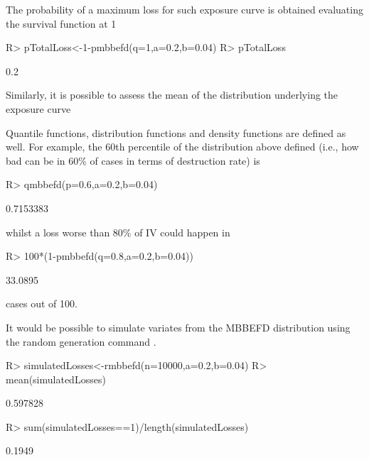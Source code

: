 \documentclass[nojss]{jss}
\begin{document}
The probability of a maximum loss for such exposure curve is obtained evaluating the survival function at 1

\begin{Schunk}
\begin{Sinput}
R> pTotalLoss<-1-pmbbefd(q=1,a=0.2,b=0.04)
R> pTotalLoss
\end{Sinput}
\begin{Soutput}
[1] 0.2
\end{Soutput}
\end{Schunk}

Similarly, it is possible to assess the mean of the distribution underlying the exposure curve 


Quantile functions, distribution functions and density functions are defined as well. For example, the 60th percentile of the distribution above defined (i.e., how bad can be in 60\% of cases in terms of destruction rate) is

\begin{Schunk}
\begin{Sinput}
R> qmbbefd(p=0.6,a=0.2,b=0.04)
\end{Sinput}
\begin{Soutput}
[1] 0.7153383
\end{Soutput}
\end{Schunk}

whilst a loss worse than 80\% of IV could happen in 

\begin{Schunk}
\begin{Sinput}
R> 100*(1-pmbbefd(q=0.8,a=0.2,b=0.04))
\end{Sinput}
\begin{Soutput}
[1] 33.0895
\end{Soutput}
\end{Schunk}

cases out of 100.

It would be possible to simulate variates from the MBBEFD distribution using the 
random generation command .

\begin{Schunk}
\begin{Sinput}
R> simulatedLosses<-rmbbefd(n=10000,a=0.2,b=0.04)
R> mean(simulatedLosses)
\end{Sinput}
\begin{Soutput}
[1] 0.597828
\end{Soutput}
\begin{Sinput}
R> sum(simulatedLosses==1)/length(simulatedLosses)
\end{Sinput}
\begin{Soutput}
[1] 0.1949
\end{Soutput}
\end{Schunk}
\end{document}
